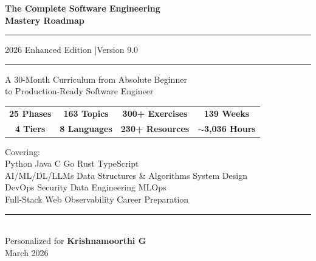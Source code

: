 \documentclass[11pt, a4paper, oneside]{report}
\begin{document}
\begin{titlepage}
\centering
\vspace*{1.5cm}

{\Huge\bfseries\color{chaptercolor} The Complete Software Engineering\\[0.4cm]
Mastery Roadmap}

\vspace{0.8cm}
\rule{\textwidth}{1.5pt}
\vspace{0.4cm}

{\Large\color{sectioncolor} 2026 Enhanced Edition \quad|\quad Version 9.0}

\vspace{0.3cm}
\rule{\textwidth}{0.4pt}

\vspace{1.2cm}

{\large A 30-Month Curriculum from Absolute Beginner\\
to Production-Ready Software Engineer}

\vspace{1.5cm}

\begin{tcolorbox}[colback=blue!3, colframe=blue!50!black,
  boxrule=0.8pt, arc=5pt, width=0.85\textwidth,
  halign=center, fontupper=\large]
\begin{tabular}{cccc}
\textbf{25 Phases} & \textbf{163 Topics} & \textbf{300+ Exercises} & \textbf{139 Weeks} \\[4pt]
\textbf{4 Tiers} & \textbf{8 Languages} & \textbf{230+ Resources} & \textbf{$\sim$3,036 Hours}
\end{tabular}
\end{tcolorbox}

\vspace{1.5cm}

{\large Covering:}\\[0.3cm]
{\normalsize
Python \textbullet{} Java \textbullet{} C \textbullet{} Go \textbullet{} Rust \textbullet{} TypeScript\\[0.2cm]
AI/ML/DL/LLMs \textbullet{} Data Structures \& Algorithms \textbullet{} System Design\\[0.2cm]
DevOps \textbullet{} Security \textbullet{} Data Engineering \textbullet{} MLOps\\[0.2cm]
Full-Stack Web \textbullet{} Observability \textbullet{} Career Preparation}

\vfill

\rule{0.6\textwidth}{0.4pt}\\[0.3cm]
{\normalsize Personalized for \textbf{Krishnamoorthi G}}\\[0.2cm]
{\small March 2026}

\end{titlepage}
\end{document}
